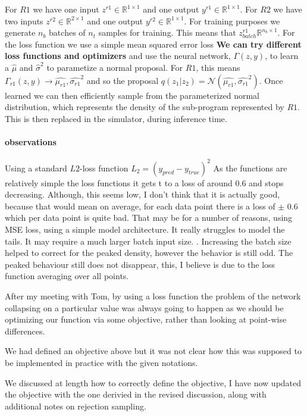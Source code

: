 \documentclass{article}
\begin{document}
For $R1$ we have one input $z^{r1} \in \mathbb{R}^{1 \times 1}$ and one output $y^{r1} \in \mathbb{R}^{1 \times 1}$.
For $R2$ we have two inputs $z^{r2} \in \mathbb{R}^{2 \times 1}$ and one output $y^{r2} \in \mathbb{R}^{1 \times 1}$.
For training purposes we generate $n_{b}$ batches of $n_{t}$ samples for training. 
This means that $z^{r1}_{batch}\mathbb{R}^{n_{b} \times 1}$. 
For the loss function we use a simple mean squared error loss \textbf{We can try different loss 
functions and optimizers} and use the
neural network, $\Gamma(z, y)$, to learn a $\hat{\mu}$ and $\hat{\sigma}^{2}$ to parametize 
a normal proposal. For $R1$, this means $\Gamma_{r1}(z,y) \rightarrow \hat{\mu_{r1}},  \hat{\sigma_{r1}}^{2}$  
and so the proposal $q(z_{1} | z_{2}) = \mathcal{N}(\hat{\mu_{r1}},  \hat{\sigma_{r1}}^{2})$. 
Once learned we can then efficiently sample from the parameterized normal distribution, which
represents the density of the sub-program represented by $R1$. 
This is then replaced in the simulator, during inference time. 

\paragraph{observations} 
Using a standard $L2$-loss function $L_{2} = (y_{pred} - y_{true})^{2}$
As the functions are relatively simple the loss functions it gets t
to a loss of around 0.6 and stops decreasing. Although, this seems low, I don't think that it is
actually good, because that would mean on average, for each data point there is a loss of $\pm$ 0.6
which per data point is quite bad. That may be for a number of reasons, using MSE loss, using a simple
model architecture. It really struggles to model the tails. It may require a much larger batch input size. 
. Increasing the batch size helped to correct for the peaked density, however the behavior is still odd.
The peaked behaviour still does not disappear, this, I believe is due to the loss function averaging 
over all points.

After my meeting with Tom, by using a loss function the problem of the network collapsing on a particular value was always going to 
happen as we should be optimizing our function via some objective, rather than looking at point-wise differences. 

We had defined an objective above but it was not clear how this was supposed to be implemented in practice with the given notations. 

We discussed at length how to correctly define the objective, I have now updated the objective with the one derivied in the revised discussion,
along with additional notes on rejection sampling. 
\end{document}
